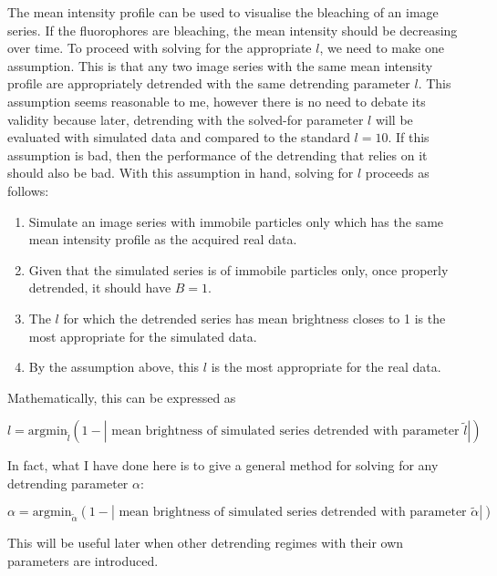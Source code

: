 \documentclass[12pt,]{book}
\providecommand{\tightlist}{%
  \setlength{\itemsep}{0pt}\setlength{\parskip}{0pt}}
\theoremstyle{definition}
\theoremstyle{definition}
\theoremstyle{definition}
\theoremstyle{remark}
\begin{document}
The mean intensity profile can be used to visualise the bleaching of an
image series. If the fluorophores are bleaching, the mean intensity
should be decreasing over time. To proceed with solving for the
appropriate \(l\), we need to make one assumption. This is that any two
image series with the same mean intensity profile are appropriately
detrended with the same detrending parameter \(l\). This assumption
seems reasonable to me, however there is no need to debate its validity
because later, detrending with the solved-for parameter \(l\) will be
evaluated with simulated data and compared to the standard \(l = 10\).
If this assumption is bad, then the performance of the detrending that
relies on it should also be bad. With this assumption in hand, solving
for \(l\) proceeds as follows:

\begin{enumerate}
\def\labelenumi{\arabic{enumi}.}
\tightlist
\item
  Simulate an image series with immobile particles only which has the
  same mean intensity profile as the acquired real data.
\item
  Given that the simulated series is of immobile particles only, once
  properly detrended, it should have \(B = 1\).
\item
  The \(l\) for which the detrended series has mean brightness closes to
  1 is the most appropriate for the simulated data.
\item
  By the assumption above, this \(l\) is the most appropriate for the
  real data.
\end{enumerate}

Mathematically, this can be expressed as

\begin{equation}
l = \text{argmin}_{\tilde{l}} (1 - |\text{ mean brightness of simulated series detrended with parameter } \tilde{l}|)
\label{eq:leq}
\end{equation}

In fact, what I have done here is to give a general method for solving
for any detrending parameter \(\alpha\):

\begin{equation}
\alpha = \text{argmin}_{\tilde{\alpha}} (1 - |\text{ mean brightness of simulated series detrended with parameter } \tilde{\alpha}|)
\label{eq:detrend-param}
\end{equation}

This will be useful later when other detrending regimes with their own
parameters are introduced.
\end{document}
